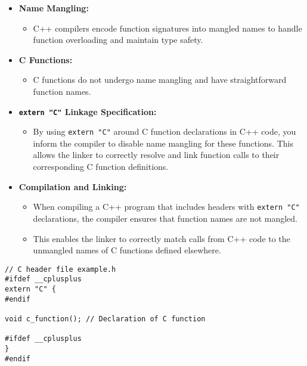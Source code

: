 \begin{itemize}
    \item \textbf{Name Mangling:}
    \begin{itemize}
        \item C++ compilers encode function signatures into mangled names to handle function overloading and maintain type safety.
    \end{itemize}
    
    \item \textbf{C Functions:}
    \begin{itemize}
        \item C functions do not undergo name mangling and have straightforward function names.
    \end{itemize}
    
    \item \textbf{\texttt{extern "C"} Linkage Specification:}
    \begin{itemize}
        \item By using \texttt{extern "C"} around C function declarations in C++ code, you inform the compiler to disable name mangling for these functions. This allows the linker to correctly resolve and link function calls to their corresponding C function definitions.
    \end{itemize}
    
    \item \textbf{Compilation and Linking:}
    \begin{itemize}
        \item When compiling a C++ program that includes headers with \texttt{extern "C"} declarations, the compiler ensures that function names are not mangled.
        \item This enables the linker to correctly match calls from C++ code to the unmangled names of C functions defined elsewhere.
    \end{itemize}
\end{itemize}    

\begin{tcolorbox}[title=C Function to C++]
\begin{verbatim}
// C header file example.h
#ifdef __cplusplus
extern "C" {
#endif

void c_function(); // Declaration of C function

#ifdef __cplusplus
}
#endif
\end{verbatim}
\end{tcolorbox}


